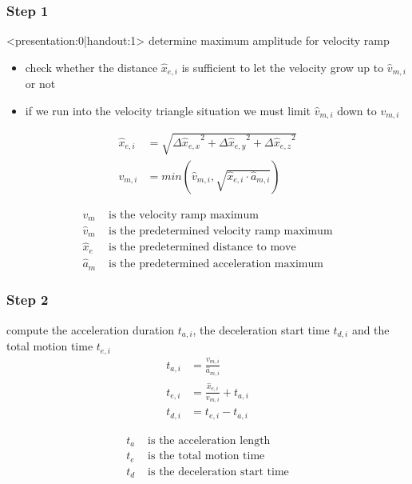 \documentclass[%
  professionalfonts,%
  xcolor={%
    usenames,%
    dvipsnames,%
    svgnames,%
    table,%
    hyperref%
  }%
]{beamer}
\begin{document}
\subsubsection{Step 1}
\begin{frame}<presentation:0|handout:1>
determine maximum amplitude for velocity ramp
\begin{itemize}
\item check whether the distance $\hat{x}_{e,i}$ is sufficient to let the velocity grow up to $\hat{v}_{m,i}$ or not
\item if we run into the velocity triangle situation we must limit $\hat{v}_{m,i}$ down to $v_{m,i}$
\end{itemize}
\end{frame}

\begin{frame}
\begin{align*}
\hat{x}_{e,i} & = \sqrt{{\Delta\hat{x}_{e,x}}^{2} + {\Delta\hat{x}_{e,y}}^{2} + {\Delta\hat{x}_{e,z}}^{2} } \\
v_{m,i } & = min(\hat{v}_{m,i},\sqrt{\hat{x}_{e,i} \cdot \hat{a}_{m,i}})  \label{eq:asynvmi}
\end{align*}

\begin{align*}
v_{m} & \text{ is the velocity ramp maximum} \\
\hat{v}_{m} & \text{ is the predetermined velocity ramp maximum} \\
\hat{x}_{e} & \text{ is the predetermined distance to move} \\
\hat{a}_{m} & \text{ is the predetermined acceleration maximum} 
\end{align*}
\end{frame}

\subsubsection{Step 2}
\begin{frame}
compute the acceleration duration $t_{a,i}$, the deceleration start time $t_{d,i}$ and the total motion time $t_{e,i}$
\begin{align*}
t_{a,i} & = \frac{v_{m,i}}{\hat{a}_{m,i}} \\
t_{e,i} & = \frac{\hat{x}_{e,i}}{v_{m,i}} + t_{a,i} \\
t_{d,i} & = t_{e,i} - t_{a,i}
\end{align*}

\begin{align*}
t_{a} & \text{ is the acceleration length} \\
t_{e} & \text{ is the total motion time} \\
t_{d} & \text{ is the deceleration start time}
\end{align*}
\end{frame}
  
\end{document}
